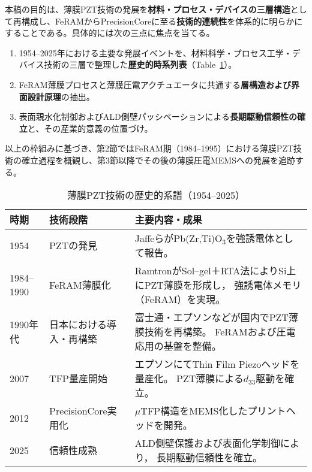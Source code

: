 \documentclass[conference]{IEEEtran}
\begin{document}
本稿の目的は、薄膜PZT技術の発展を\textbf{材料・プロセス・デバイスの三層構造}として再構成し、FeRAMからPrecisionCoreに至る\textbf{技術的連続性}を体系的に明らかにすることである。具体的には次の三点に焦点を当てる。
\begin{enumerate}
  \item 1954--2025年における主要な発展イベントを、材料科学・プロセス工学・デバイス技術の三層で整理した\textbf{歴史的時系列表}（Table~\ref{tab:timeline}）。
  \item FeRAM薄膜プロセスと薄膜圧電アクチュエータに共通する\textbf{層構造および界面設計原理}の抽出。
  \item 表面親水化制御およびALD側壁パッシベーションによる\textbf{長期駆動信頼性の確立}と、その産業的意義の位置づけ。
\end{enumerate}

\medskip
以上の枠組みに基づき、第2節ではFeRAM期（1984--1995）における薄膜PZT技術の確立過程を概観し、第3節以降でその後の薄膜圧電MEMSへの発展を追跡する。

\begin{table}[!t]
\centering
\caption{薄膜PZT技術の歴史的系譜（1954--2025）}
\label{tab:timeline}
\renewcommand{\arraystretch}{1.15}
\setlength{\tabcolsep}{3pt} %
\footnotesize %
\begin{tabular}{@{}p{1.2cm}p{2.2cm}p{5.0cm}@{}} %
\toprule
\textbf{時期} & \textbf{技術段階} & \textbf{主要内容・成果} \\ \midrule
1954 & PZTの発見 &
JaffeらがPb(Zr,Ti)O$_3$を強誘電体として報告\cite{jaffe1954}。\\[3pt]

1984--1990 & FeRAM薄膜化 &
RamtronがSol--gel＋RTA法によりSi上にPZT薄膜を形成し，
強誘電体メモリ（FeRAM）を実現\cite{ramtron_iedm1989}。\\[3pt]

1990年代 & 日本における導入・再構築 &
富士通・エプソンなどが国内でPZT薄膜技術を再構築。
FeRAMおよび圧電応用の基盤を整備。\\[3pt]

2007 & TFP量産開始 &
エプソンにてThin Film Piezoヘッドを量産化。
PZT薄膜による$d_{33}$駆動を確立。\\[3pt]

2012 & PrecisionCore実用化 &
$\mu$TFP構造をMEMS化したプリントヘッドを開発\cite{uemura2014mems}。\\[3pt]

2025 & 信頼性成熟 &
ALD側壁保護および表面化学制御により，
長期駆動信頼性を確立。\\
\bottomrule
\end{tabular}
\normalsize
\end{table}
\end{document}
